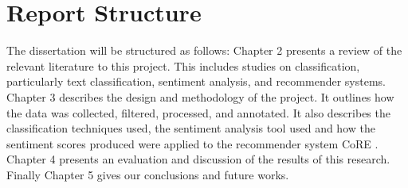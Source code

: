 \section{Report Structure}
The dissertation will be structured as follows: 
Chapter 2 presents a review of the relevant literature to this project. This includes studies on classification, particularly text classification, sentiment analysis, and recommender systems. Chapter 3 describes the design and methodology of the project. It outlines how the data was collected, filtered, processed, and annotated. It also describes the classification techniques used, the sentiment analysis tool used and how the sentiment scores produced were applied to the recommender system CoRE \cite{core2019}. Chapter 4 presents an evaluation and discussion of the results of this research. Finally Chapter 5 gives our conclusions and future works.
